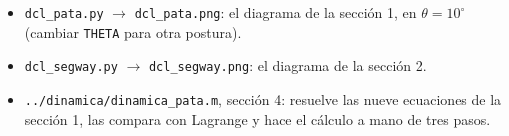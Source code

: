 \documentclass[11pt,a4paper]{article}
\begin{document}
\begin{itemize}
\item \texttt{dcl\_pata.py} \(\to\) \texttt{dcl\_pata.png}: el diagrama de la sección 1, en \(\theta=10^\circ\)
  (cambiar \texttt{THETA} para otra postura).
\item \texttt{dcl\_segway.py} \(\to\) \texttt{dcl\_segway.png}: el diagrama de la sección 2.
\item \texttt{../dinamica/dinamica\_pata.m}, sección 4: resuelve las nueve ecuaciones de la sección 1, las
  compara con Lagrange y hace el cálculo a mano de tres pasos.
\end{itemize}
\end{document}
